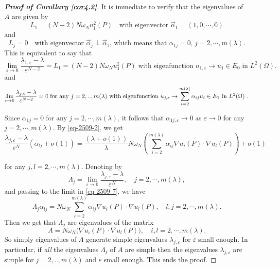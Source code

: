 \documentclass[11pt,reqno]{article}
\numberwithin{equation}{section}
\newcommand\e\varepsilon
\newcommand\la\lambda
\newcommand\La\Lambda
\renewcommand\o\omega
\renewcommand\O\Omega
\begin{document}
\begin{proof}[\bf Proof of Corollary \ref{cor4.2}]
It is immediate to verify that the eigenvalues of $A$ are given by
		\begin{equation}
			L_1=(N-2)N\o_Nu^2_1(P)\quad \text{with eigenvector $\vec{\alpha}_1=(1,0,\cdots,0)$}
		\end{equation}
		and 
		\begin{equation}
			L_j=0\quad \text{with eigenvector $\vec{\alpha}_j\perp\vec{\alpha}_1$, which means that $\alpha_{1j}=0,\, j=2,\cdots,m(\la)$.}
		\end{equation}
		This is equivalent to say that
		\begin{equation}\label{eq-2509-5}
			\lim\limits_{\e\to0}\frac{\la_{1,\e}-\la}{\e^{N-2}}
			=L_1=(N-2)N\o_Nu^2_1(P) \text{ with eigenfunction $u_{1,\e}\to u_1\in E_0$ in $L^2(\O)$.}
		\end{equation}
		and
		\begin{equation}\label{eq-2509-6}
			\lim\limits_{\e\to0}\frac{\la_{j,\e}-\la}{\e^{N-2}}
			=0\;\hbox{for any }j=2,..,m(\la) \text{ with eigenfunction $u_{j,\e}\to \sum_{i=2}^{m(\la)}\alpha_{ij}u_i\in E_1$ in $L^2(\O)$ .}
		\end{equation}
        
		Since $\alpha_{1j}=0$ for any $j=2,\cdots,m(\la)$, it follows that $\alpha_{1j,\e}\to 0$ as $\e\to 0$ for any $j=2,\cdots,m(\la)$.
		By \eqref{eq-2509-2}, we get 
		\begin{equation}\label{eq-2509-7}
			\frac{\lambda_{j,\e}-\la}{\e^{N}}(\alpha_{lj}+o(1))=\frac{(\la+o(1))}{\la }N\omega_N\left(\sum_{i=2}^{m(\la)}\alpha_{ij}\nabla u_i(P)\cdot\nabla u_l(P)\right)+o(1)
		\end{equation}

        for any $j,l=2,\cdots,m(\la)$.
		Denoting by 
		\begin{equation} \label{eq-2509-8*}
			\Lambda_j=\lim\limits_{\e \to 0}\frac{\lambda_{j,\e}-\la}{\e^{N}},\quad j=2,\cdots,m(\la),
		\end{equation}
		and passing to the limit in \eqref{eq-2509-7}, we have 
		\begin{equation}\label{eq-2509-8}
			\Lambda_j\alpha_{lj}=N\omega_N\sum_{i=2}^{m(\la)}\alpha_{ij}\nabla u_i(P)\cdot\nabla u_l(P),\quad l,j=2,\cdots,m(\la).
		\end{equation}
		Then we get that $\Lambda_j$ are eigenvalues of the matrix 
		\begin{equation*}
			A=N\omega_N\Big(\nabla u_i(P)\cdot\nabla u_l(P)\Big),\quad i,l=2,\cdots,m(\la).
		\end{equation*}
		So simply eigenvalues of $A$ generate simple eigenvalues $\lambda_{j,\e}$ for $\e$ small enough. In particular, if {\em all} the eigenvalues $\La_j$ of $A$ are simple then the eigenvalues $\lambda_{j,\e}$ are simple for $j=2,..,m(\la)$ and $\e$ small enough.
        This ends the proof.
        \end{proof}
\end{document}
